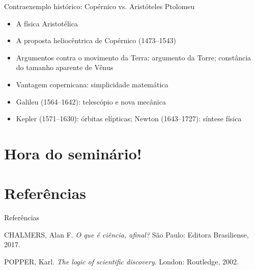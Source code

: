 \documentclass[numbering=fraction,aspectratio=169]{beamer}
\begin{document}
\begin{frame}{Contraexemplo histórico: Copérnico vs. Aristóteles Ptolomeu}
  \begin{itemize}
  \item<1-> A \alert<1>{física Aristotélica}
  \item<2-> A \alert<2>{proposta heliocêntrica} de Copérnico (1473--1543)
  \item<3-> Argumentos contra o movimento da Terra: \alert<3>{argumento da Torre}; constância do \alert<3>{tamanho aparente de Vênus}
  \item<4-> Vantagem copernicana: \alert<4>{simplicidade matemática}
  \item<5-> Galileu (1564--1642): \alert<5>{telescópio e nova mecânica}
  \item<6-> Kepler (1571--1630): \alert<6>{órbitas elípticas}; Newton (1643--1727): \alert<6>{síntese física}
  \end{itemize}
\end{frame}


\section{Hora do seminário!}



\section{Referências}

\begin{frame}[allowframebreaks]{Referências}
  \begin{thebibliography}{9}

    CHALMERS, Alan F.
    \emph{O que é ciência, afinal?}
    São Paulo: Editora Brasiliense, 2017.

    POPPER, Karl.
    \emph{The logic of scientific discovery}.
    London: Routledge, 2002.

  \end{thebibliography}
\end{frame}
\end{document}
